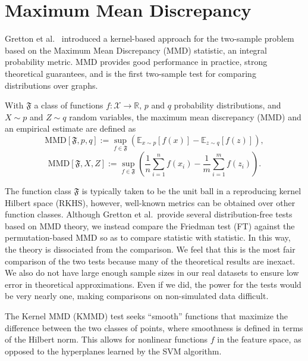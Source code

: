 \section{Maximum Mean Discrepancy}
\label{S:MMD}
Gretton et al.\ \cite{gretton19m, gretton2010fast, gretton2012kernel,
  borgwardt2006integrating} introduced a kernel-based approach for
the two-sample problem based on the Maximum Mean Discrepancy (MMD)
statistic, an integral probability metric.  MMD provides good
performance in practice, strong theoretical guarantees, and is the
first two-sample test for comparing distributions over graphs.

\begin{definition}
  With $\mathfrak{F}$ a class of functions $f:\mathcal{X} \to
  \mathbb{R}$, $p$ and $q$ probability distributions, and $X \sim p$
  and $Z \sim q$ random variables, the maximum mean discrepancy (MMD)
  and an empirical estimate are defined as
  \begin{equation*}
    \text{MMD}[\mathfrak{F},p,q] := \sup_{f\in
      \mathfrak{F}}(\mathbb{E}_{x\sim p}[f(x)] - \mathbb{E}_{z\sim q}[f(z)]),
  \end{equation*}
  \begin{equation*}
    \text{MMD}[\mathfrak{F},X,Z] := \sup_{f\in
      \mathfrak{F}}\left (\frac{1}{n}\sum_{i=1}^nf(x_i) -
    \frac{1}{m}\sum_{i=1}^{m} f(z_i) \right ).
  \end{equation*}
\end{definition}

The function class $\mathfrak{F}$ is typically taken to be the unit ball in a
reproducing kernel Hilbert space (RKHS), however, well-known metrics
can be obtained over other function classes.  Although Gretton et
al.\ provide several distribution-free tests based on MMD theory, we
instead compare the Friedman test (FT) against the permutation-based
MMD so as to compare statistic with statistic.  In this way, the
theory is dissociated from the comparison.  We feel that this is the
most fair comparison of the two tests because many of the theoretical
results are inexact.  We also do not have large enough sample sizes in
our real datasets to ensure low error in theoretical approximations.
Even if we did, the power for the tests would be very nearly one,
making comparisons on non-simulated data difficult.

The Kernel MMD (KMMD) test seeks ``smooth'' functions that maximize
the difference between the two classes of points, where smoothness
is defined in terms of the Hilbert norm.  This allows for nonlinear
functions $f$ in the feature space, as opposed to the hyperplanes
learned by the SVM algorithm.

